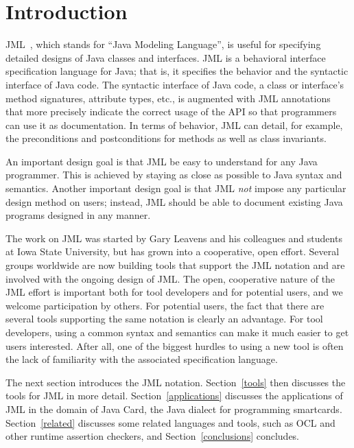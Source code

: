 \documentclass{entcs}
\begin{document}
\vspace*{-2ex}
\section{Introduction}

JML~\cite{Leavens-Baker-Ruby99b,Leavens-Baker-Ruby03}, which stands
for ``Java Modeling Language'', is useful for specifying detailed
designs of Java classes and interfaces.  JML is a behavioral interface
specification language for Java; that is, it specifies the behavior
and the syntactic interface of Java code.  The syntactic interface of
Java code, a class or interface's method signatures, attribute types,
etc., is augmented with JML annotations that more precisely indicate
the correct usage of the API so that programmers can use it as
documentation.  In terms of behavior, JML can detail, for example, the
preconditions and postconditions for methods as well as class
invariants.

An important design goal is that JML be easy to understand for any
Java programmer. This is achieved by staying as close as possible to
Java syntax and semantics.  Another important design goal is that JML
{\em not} impose any particular design method on users; instead, JML
should be able to document existing Java programs designed in any
manner.

The work on JML was started by Gary Leavens and his colleagues and
students at Iowa State University, but has grown into a cooperative,
open effort.  Several groups worldwide are now building tools that
support the JML notation and are involved with the ongoing design of
JML\@.  The open, cooperative nature of the JML effort is important both
for tool developers and for potential users, and we welcome
participation by others.  For potential users, the fact that there are
several tools supporting the same notation is clearly an advantage.
For tool developers, using a common syntax and semantics can make it
much easier to get users interested. After all, one of the biggest
hurdles to using a new tool is often the lack of familiarity with the
associated specification language.

\medskip

The next section introduces the JML notation.  Section~\ref{tools}
then discusses the tools for JML in more detail.
Section~\ref{applications} discusses the applications of JML in the
domain of Java Card, the Java dialect for programming smartcards.
Section~\ref{related} discusses some related languages and tools, such
as OCL and other runtime assertion checkers, and 
Section~\ref{conclusions} concludes.
\end{document}
